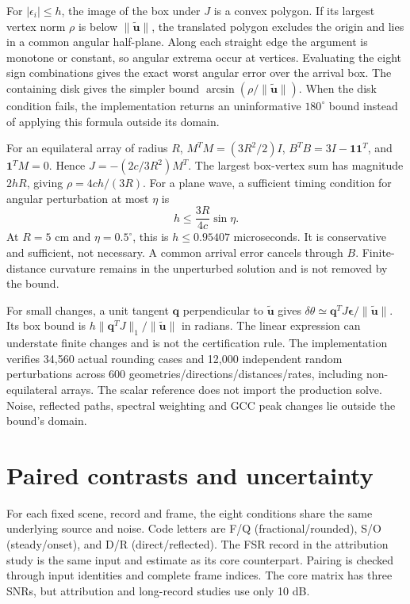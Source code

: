 \documentclass[10pt,a4paper]{article}
\begin{document}
For $|\epsilon_i|\leq h$, the image of the box under $J$ is a convex polygon. If its largest vertex norm $\rho$ is below $\|\widetilde{\mathbf u}\|$, the translated polygon excludes the origin and lies in a common angular half-plane. Along each straight edge the argument is monotone or constant, so angular extrema occur at vertices. Evaluating the eight sign combinations gives the exact worst angular error over the arrival box. The containing disk gives the simpler bound $\arcsin(\rho/\|\widetilde{\mathbf u}\|)$. When the disk condition fails, the implementation returns an uninformative $180^\circ$ bound instead of applying this formula outside its domain.

For an equilateral array of radius $R$, $M^TM=(3R^2/2)I$, $B^TB=3I-\mathbf1\mathbf1^T$, and $\mathbf1^TM=0$. Hence $J=-(2c/3R^2)M^T$. The largest box-vertex sum has magnitude $2hR$, giving $\rho=4ch/(3R)$. For a plane wave, a sufficient timing condition for angular perturbation at most $\eta$ is
\begin{equation}
h\leq\frac{3R}{4c}\sin\eta.
\end{equation}
At $R=5$ cm and $\eta=0.5^\circ$, this is $h\leq0.95407$ microseconds. It is conservative and sufficient, not necessary. A common arrival error cancels through $B$. Finite-distance curvature remains in the unperturbed solution and is not removed by the bound.

For small changes, a unit tangent $\mathbf q$ perpendicular to $\widetilde{\mathbf u}$ gives $\delta\theta\simeq\mathbf q^TJ\boldsymbol\epsilon/\|\widetilde{\mathbf u}\|$. Its box bound is $h\|\mathbf q^TJ\|_1/\|\widetilde{\mathbf u}\|$ in radians. The linear expression can understate finite changes and is not the certification rule. The implementation verifies 34,560 actual rounding cases and 12,000 independent random perturbations across 600 geometries/directions/distances/rates, including non-equilateral arrays. The scalar reference does not import the production solve. Noise, reflected paths, spectral weighting and GCC peak changes lie outside the bound's domain.

\section{Paired contrasts and uncertainty}
For each fixed scene, record and frame, the eight conditions share the same underlying source and noise. Code letters are F/Q (fractional/rounded), S/O (steady/onset), and D/R (direct/reflected). The FSR record in the attribution study is the same input and estimate as its core counterpart. Pairing is checked through input identities and complete frame indices. The core matrix has three SNRs, but attribution and long-record studies use only 10 dB.
\end{document}
